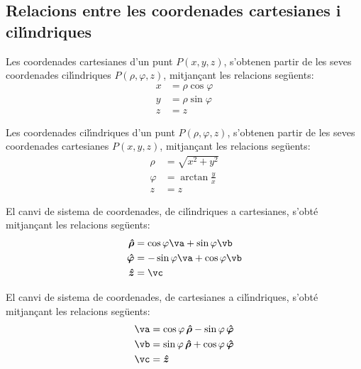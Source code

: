 \documentclass[catalan,a4paper,twoside,11pt]{article}
\begin{document}
\subsection{Relacions entre les coordenades cartesianes i
cil\'{\i}ndriques}

Les coordenades cartesianes  d'un punt $P(x,y,z)$, s'obtenen partir
de les seves coordenades cil\'{\i}ndriques $P(\rho,\varphi,z)$,
mitjan\c{c}ant les relacions seg\"{u}ents:
\begin{subequations}\begin{align}
    x &=\rho\cos\varphi \\ y &=\rho\sin\varphi \\ z &=z
\end{align}\end{subequations}

Les coordenades  cil\'{\i}ndriques  d'un punt $P(\rho,\varphi,z)$,
s'obtenen partir de les seves coordenades cartesianes $P(x,y,z)$,
mitjan\c{c}ant les relacions seg\"{u}ents:
\begin{subequations}\begin{align}
    \rho &= \sqrt{x^2+y^2}\\
    \varphi &=  \arctan\frac{y}{x}\\
    z &= z
\end{align}\end{subequations}

El canvi de sistema de coordenades, de cil\'{\i}ndriques a cartesianes,
s'obt\'{e} mitjan\c{c}ant les relacions seg\"{u}ents:
\begin{subequations}\begin{align}
    \boldsymbol{\hat{\rho}} &=\cos\varphi\va+\sin\varphi\vb \\
    \boldsymbol{\hat{\varphi}} &=-\sin\varphi\va+\cos\varphi\vb \\
    \boldsymbol{\hat{z}} &=\vc
\end{align}\end{subequations}

El canvi de sistema de coordenades, de cartesianes a cil\'{\i}ndriques,
s'obt\'{e} mitjan\c{c}ant les relacions seg\"{u}ents:
\begin{subequations}\begin{align}
    \va &=\cos\varphi\,\boldsymbol{\hat{\rho}}-\sin\varphi\,\boldsymbol{\hat{\varphi}} \\
    \vb &=\sin\varphi\,\boldsymbol{\hat{\rho}}+\cos\varphi\,\boldsymbol{\hat{\varphi}} \\
    \vc &=\boldsymbol{\hat{z}}
\end{align}\end{subequations}
\end{document}
